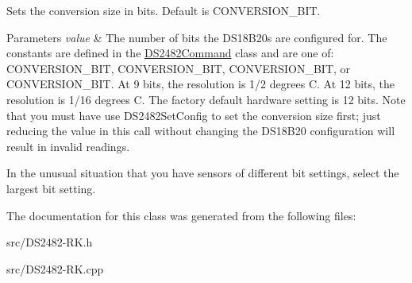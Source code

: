 Sets the conversion size in bits. Default is C\+O\+N\+V\+E\+R\+S\+I\+O\+N\+\_\+B\+IT. 


\begin{DoxyParams}{Parameters}
{\em value} & The number of bits the D\+S18\+B20s are configured for. The constants are defined in the \mbox{\hyperlink{class_d_s2482_command}{D\+S2482\+Command}} class and are one of\+: C\+O\+N\+V\+E\+R\+S\+I\+O\+N\+\_\+B\+IT, C\+O\+N\+V\+E\+R\+S\+I\+O\+N\+\_\+B\+IT, C\+O\+N\+V\+E\+R\+S\+I\+O\+N\+\_\+B\+IT, or C\+O\+N\+V\+E\+R\+S\+I\+O\+N\+\_\+B\+IT. At 9 bits, the resolution is 1/2 degrees C. At 12 bits, the resolution is 1/16 degrees C. The factory default hardware setting is 12 bits. Note that you must have use D\+S2482\+Set\+Config to set the conversion size first; just reducing the value in this call without changing the D\+S18\+B20 configuration will result in invalid readings.\\
\hline
\end{DoxyParams}
In the unusual situation that you have sensors of different bit settings, select the largest bit setting. 

The documentation for this class was generated from the following files\+:\begin{DoxyCompactItemize}
\item 
src/D\+S2482-\/\+R\+K.\+h\item 
src/D\+S2482-\/\+R\+K.\+cpp\end{DoxyCompactItemize}
